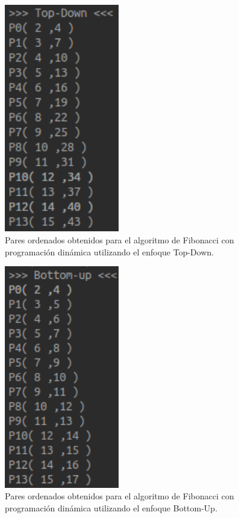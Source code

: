     \begin{figure}[h!]
        \centering
        \includegraphics[width=5cm]{Fibonacci/tab-fibo-top.png}
        \caption{Pares ordenados obtenidos para el algoritmo de Fibonacci con programación dinámica utilizando el enfoque Top-Down.}
        \label{TablaFiboTop}
    \end{figure}
    \newpage
    \begin{figure}[h!]
        \centering
        \includegraphics[width=5cm]{Fibonacci/tab-fibo-botttom.png}
        \caption{Pares ordenados obtenidos para el algoritmo de Fibonacci con programación dinámica utilizando el enfoque Bottom-Up.}
        \label{TablaFiboBottom}
    \end{figure}
    
